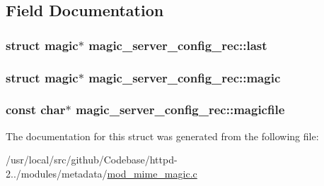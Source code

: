 \subsection{Field Documentation}
\subsubsection[{\texorpdfstring{last}{last}}]{\setlength{\rightskip}{0pt plus 5cm}struct {\bf magic}$\ast$ magic\+\_\+server\+\_\+config\+\_\+rec\+::last}\hypertarget{structmagic__server__config__rec_a7bdc6bbfc5d0f45adda8d2c72755121a}{}\label{structmagic__server__config__rec_a7bdc6bbfc5d0f45adda8d2c72755121a}
\subsubsection[{\texorpdfstring{magic}{magic}}]{\setlength{\rightskip}{0pt plus 5cm}struct {\bf magic}$\ast$ magic\+\_\+server\+\_\+config\+\_\+rec\+::magic}\hypertarget{structmagic__server__config__rec_a472fdd35bf67ceea2a81085c5d29b05e}{}\label{structmagic__server__config__rec_a472fdd35bf67ceea2a81085c5d29b05e}
\subsubsection[{\texorpdfstring{magicfile}{magicfile}}]{\setlength{\rightskip}{0pt plus 5cm}const char$\ast$ magic\+\_\+server\+\_\+config\+\_\+rec\+::magicfile}\hypertarget{structmagic__server__config__rec_aa171b9ab9cac8a5c788f03dc72d5789a}{}\label{structmagic__server__config__rec_aa171b9ab9cac8a5c788f03dc72d5789a}


The documentation for this struct was generated from the following file\+:\begin{DoxyCompactItemize}
\item 
/usr/local/src/github/\+Codebase/httpd-\/2../modules/metadata/\hyperlink{mod__mime__magic_8c}{mod\+\_\+mime\+\_\+magic.\+c}\end{DoxyCompactItemize}
